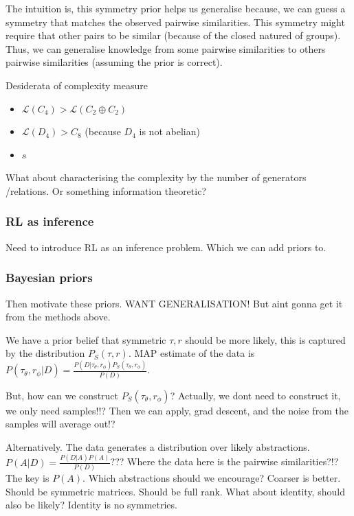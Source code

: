 The intuition is, this symmetry prior helps us generalise because, we can guess
a symmetry that matches the observed pairwise similarities. This symmetry might
require that other pairs to be similar (because of the closed natured of groups).
Thus, we can generalise knowledge from some pairwise similarities to others
pairwise similarities (assuming the prior is correct).

Desiderata of complexity measure
\begin{itemize}
	\tightlist
	\item $\mathcal L(C_4) > \mathcal L(C_2\oplus C_2)$
	\item $\mathcal L(D_4) > C_8$ (because $D_4$ is not abelian)
	\item $s$
\end{itemize}

What about characterising the complexity by the number of generators /relations.
Or something information theoretic?


\subsubsection{RL as inference}

Need to introduce RL as an inference problem. Which we can add priors to.


\subsubsection{Bayesian priors}

Then motivate these priors. WANT GENERALISATION! But aint gonna get it from the
methods above.




We have a prior belief that symmetric $\tau, r$ should be more likely, this is captured by the distribution $P_S(\tau, r)$.
MAP estimate of the data is $P(\tau_{\theta}, r_{\phi}| D) = \frac{P(D | \tau_{\theta}, r_{\phi})P_S(\tau_{\theta}, r_{\phi})}{P(D)}$.

But, how can we construct $P_S(\tau_{\theta}, r_{\phi})$?
Actually, we dont need to construct it, we only need samples!!?
Then we can apply, grad descent, and the noise from the samples will average out!?


Alternatively. The data generates a distribution over likely abstractions.
$P(A|D) = \frac{P(D|A)P(A)}{P(D)}$??? Where the data here is the pairwise similarities?!?
The key is $P(A)$. Which abstractions should we encourage? Coarser is better.
Should be symmetric matrices. Should be full rank. What about identity, should also be likely?
Identity is no symmetries.

